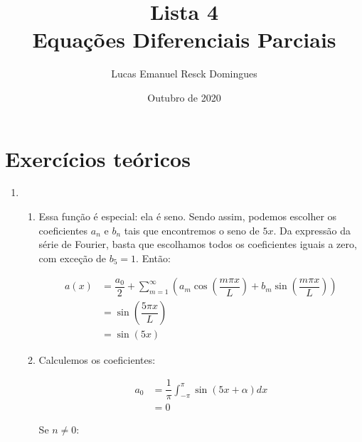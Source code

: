 \documentclass{article}
\title{Lista 4 \\
\large Equações Diferenciais Parciais}
\author{Lucas Emanuel Resck Domingues}
\date{Outubro de 2020}
\begin{document}
    \maketitle
    
    \section*{Exercícios teóricos}

        \begin{enumerate}
            \item            
                \begin{enumerate}
                    \item Essa função é especial: ela é seno.
                        Sendo assim, podemos escolher os coeficientes
                        $a_n$ e $b_n$ tais que encontremos o seno de $5x$.
                        Da expressão da série de Fourier, basta que escolhamos
                        todos os coeficientes iguais a zero, com exceção de $b_5 = 1$.
                        Então:
                        
                        \begin{align*}
                            a(x) &= \dfrac{a_0}{2} + \sum_{m=1}^{\infty} \left(a_m \cos \left(\dfrac{m \pi x}{L}\right) + b_m \sin \left(\dfrac{m \pi x}{L}\right)\right) \\
                            &= \sin \left(\dfrac{5 \pi x}{L}\right) \\
                            &= \sin(5x)
                        \end{align*}

                    \item Calculemos os coeficientes:
                    
                        \begin{align*}
                            a_0 &= \dfrac{1}{\pi} \int_{-\pi}^{\pi} \sin(5x + \alpha) dx \\
                            &= 0
                        \end{align*}

                        Se $n \ne 0$:
                        

\end{enumerate}
\end{enumerate}
\end{document}
